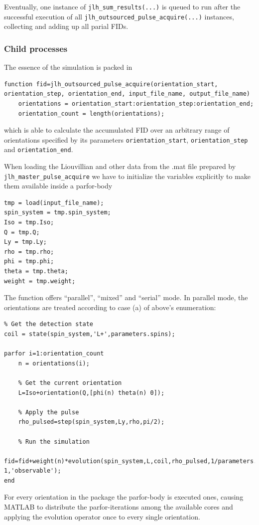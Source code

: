 \documentclass[11.5pt,a4paper]{article}
\begin{document}
Eventually, one instance of \verb$jlh_sum_results(...)$ is queued to run after the successful execution of all \texttt{jlh\_outsourced\_pulse\_acquire(...)} instances, collecting and adding up all parial FIDs.

\subsubsection{Child processes}
The essence of the simulation is packed in
\begin{lstlisting}
function fid=jlh_outsourced_pulse_acquire(orientation_start, orientation_step, orientation_end, input_file_name, output_file_name)
    orientations = orientation_start:orientation_step:orientation_end;
    orientation_count = length(orientations);
\end{lstlisting}
which is able to calculate the accumulated FID over an arbitrary range of orientations specified by its parameters \verb$orientation_start$, \verb$orientation_step$ and \verb$orientation_end$. 

When loading the Liouvillian and other data from the .mat file prepared by \verb$jlh_master_pulse_acquire$ we have to initialize the variables explicitly to make them available inside a parfor-body
\begin{lstlisting}
tmp = load(input_file_name);
spin_system = tmp.spin_system;
Iso = tmp.Iso;
Q = tmp.Q;
Ly = tmp.Ly;
rho = tmp.rho;
phi = tmp.phi;
theta = tmp.theta;
weight = tmp.weight;
\end{lstlisting}

The function offers ``parallel'', ``mixed'' and ``serial'' mode. In parallel mode, the orientations are treated according to case (a) of above's enumeration: 
\begin{lstlisting}
% Get the detection state            
coil = state(spin_system,'L+',parameters.spins);

parfor i=1:orientation_count
    n = orientations(i);

    % Get the current orientation
    L=Iso+orientation(Q,[phi(n) theta(n) 0]);

    % Apply the pulse
    rho_pulsed=step(spin_system,Ly,rho,pi/2);

    % Run the simulation
    fid=fid+weight(n)*evolution(spin_system,L,coil,rho_pulsed,1/parameters.sweep,parameters.npoints-1,'observable'); 
end
\end{lstlisting}
For every orientation in the package the parfor-body is executed ones, causing MATLAB to distribute the parfor-iterations among the available cores and applying the evolution operator once to every single orientation.
\end{document}
